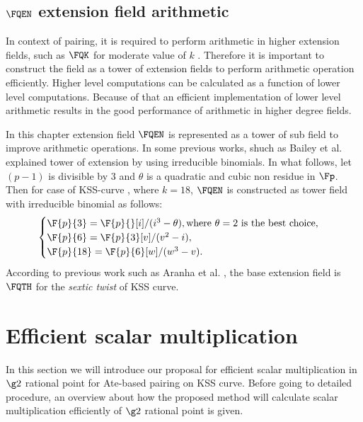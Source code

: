 \subsection{$\FQEN$ extension field arithmetic}
In context of pairing, it is required to perform arithmetic in higher extension fields, such as $\FQK$  for moderate value of $k$ \cite{Silverman}. Therefore it is important to construct the field as a tower of extension fields \cite{EPRINT:BenSco09} to perform arithmetic operation efficiently. Higher level computations can be calculated as a function of lower level computations. Because of that an efficient implementation of lower level arithmetic results in the good performance of arithmetic in higher degree fields.

In this chapter extension field  $\FQEN$ is represented as a tower of sub field to improve arithmetic operations. In some previous works, shuch as Bailey et al. \cite{JC:BaiPaa01}  explained tower of extension by using irreducible binomials. In what follows, let $(p-1)$ is divisible by 3 and $\theta$ is a quadratic and cubic non residue in $\Fp$. Then for case of KSS-curve \cite{EPRINT:KacSchSco07}, where $k=18$, $\FQEN$ is constructed as tower field with irreducible binomial as follows:
\begin{equation}\label{eq:KSS_towering}
\begin{cases}
\F{p}{3} = \F{p}{}[i]/(i^3-\theta),  \text{where $\theta = 2$ is the best choice,}\nonumber \\ 
\F{p}{6} = \F{p}{3}[v]/(v^2-i), \nonumber \\ 
\F{p}{18} = \F{p}{6}[w]/(w^3-v). \nonumber \\ 
\end{cases}
\end{equation}
According to previous work such as Aranha et al. \cite{PAIRING:AFKMR12}, the base extension field is $\FQTH$ for the \textit{sextic twist} of KSS curve.

\section{Efficient scalar multiplication}
In this section we will introduce our proposal for efficient scalar multiplication in $\g2$ rational point for Ate-based pairing on KSS curve. 
Before going to detailed procedure, an overview about how the proposed method will calculate scalar multiplication efficiently of $\g2$ rational point is given.

